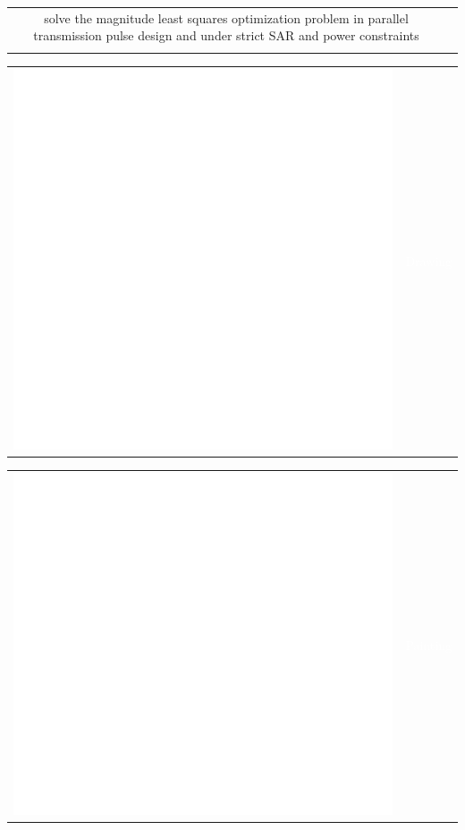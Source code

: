 \documentclass[letterpaper]{article}
\begin{document}
\begin{minipage}[t]{1\linewidth}
{\begin{minipage}[t]{0.47\linewidth}
\begin{minipage}{1\linewidth}
\begin{minipage}{1\linewidth}
{\begin{tabularx}{\textwidth}{cR}
{				solve the magnitude least squares optimization problem in 
				parallel transmission pulse design and under strict SAR and 
				power constraints}\\
				\smallskip				
			\end{tabularx}
			}
		\end{minipage} 
	\end{minipage} %
	\begin{minipage}{1\linewidth}
		\vspace{2ex}
	\end{minipage}
	\begin{minipage}{0.3\linewidth}
		\vspace{1ex}
		\centering
		\begin{tabularx}{1\textwidth}{rr}
			\includegraphics[width=0.15\linewidth]{pencil.eps} & 
			\textcolor{white}{Drawing}
		\end{tabularx}	
	\end{minipage}
	\hfill
	\begin{minipage}{0.3\linewidth}
		\vspace{1ex}
		\centering
		\begin{tabularx}{1\textwidth}{rr}	
			\includegraphics[width=0.15\linewidth]{art-palette.eps} & 
			\textcolor{white}{Painting}
		\end{tabularx}	
	\end{minipage}
	\hfill
	\begin{minipage}{0.3\linewidth}
		\vspace{1ex}
		\centering
		\begin{tabularx}{1\textwidth}{rr}

\end{tabularx}
\end{minipage}
\end{minipage}}
\end{minipage}
\end{document}
